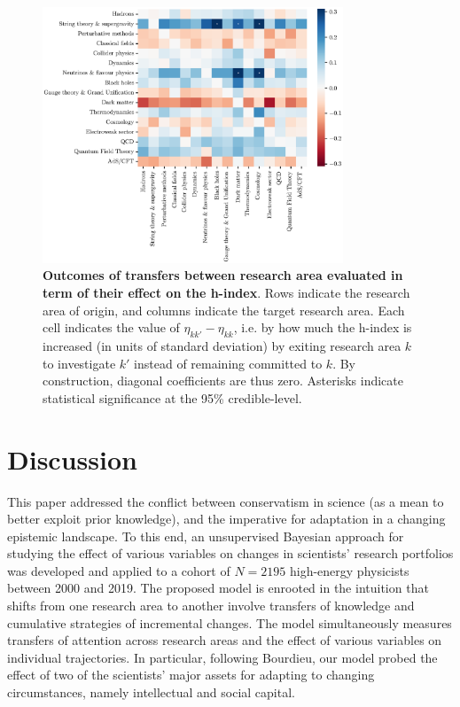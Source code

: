 \documentclass{article}
\begin{document}
\begin{figure}[h]
    \centering
    \includegraphics[width=0.8\textwidth]{plots/outcomes_rho.eps}
    \caption{\textbf{Outcomes of transfers between research area evaluated in term of their effect on the h-index}. Rows indicate the research area of origin, and columns indicate the target research area. Each cell indicates the value of $\eta_{kk'}-\eta_{kk}$, i.e. by how much the h-index is increased (in units of standard deviation) by exiting research area $k$ to investigate $k'$ instead of remaining committed to $k$. By construction, diagonal coefficients are thus zero. Asterisks indicate statistical significance at the 95\% credible-level. }
    \label{fig:outcomes_rho}
\end{figure}



\section{Discussion}

This paper addressed the conflict between conservatism in science (as a mean to better exploit prior knowledge), and the imperative for adaptation in a changing epistemic landscape. To this end, an unsupervised Bayesian approach for studying the effect of various variables on changes in scientists' research portfolios was developed and applied to a cohort of $N=2195$ high-energy physicists between 2000 and 2019. The proposed model is enrooted in the intuition that shifts from one research area to another involve transfers of knowledge and cumulative strategies of incremental changes. The model simultaneously measures transfers of attention across research areas and the effect of various variables on individual trajectories. In particular, following Bourdieu, our model probed the effect of two of the scientists' major assets for adapting to changing circumstances, namely intellectual and social capital.
\end{document}
